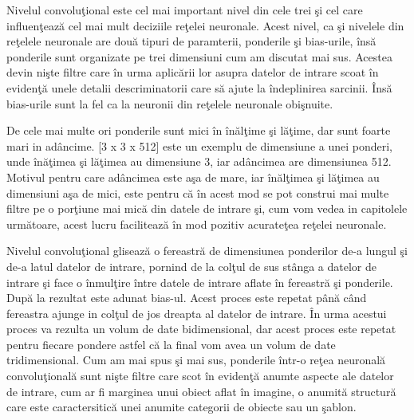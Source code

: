 Nivelul convolu\c{t}ional este cel mai important nivel din cele trei \c{s}i cel care influen\c{t}eaz\u{a} cel mai mult deciziile re\c{t}elei neuronale. Acest nivel, ca \c{s}i nivelele din re\c{t}elele neuronale are dou\u{a} tipuri de paramterii, ponderile \c{s}i bias-urile, \^{i}ns\u{a} ponderile sunt organizate pe trei dimensiuni cum am discutat mai sus. Acestea devin ni\c{s}te filtre care \^{i}n urma aplic\u{a}rii lor asupra datelor de intrare scoat \^{i}n eviden\c{t}\u{a} unele detalii descriminatorii care s\u{a} ajute la \^{i}ndeplinirea sarcinii. \^{I}ns\u{a} bias-urile sunt la fel ca la neuronii din re\c{t}elele neuronale obi\c{s}nuite. 

\par

De cele mai multe ori ponderile sunt mici \^{i}n \^{i}n\u{a}l\c{t}ime \c{s}i l\u{a}\c{t}ime, dar sunt foarte mari in ad\^{a}ncime. [3 x 3 x 512] este un exemplu de dimensiune a unei ponderi, unde \^{i}n\u{a}\c{t}imea \c{s}i l\u{a}\c{t}imea au dimensiune 3, iar ad\^{a}ncimea are dimensiunea 512. Motivul pentru care ad\^{a}ncimea este a\c{s}a de mare, iar \^{i}n\u{a}l\c{t}imea \c{s}i l\u{a}\c{t}imea au dimensiuni a\c{s}a de mici,  este pentru c\u{a} \^{i}n acest mod se pot construi mai multe filtre pe o por\c{t}iune mai mic\u{a} din datele de intrare \c{s}i, cum vom vedea in capitolele urm\u{a}toare, acest lucru faciliteaz\u{a} \^{i}n mod pozitiv acurate\c{t}ea re\c{t}elei neuronale.

\par

Nivelul convolu\c{t}ional gliseaz\u{a} o fereastr\u{a} de dimensiunea ponderilor de-a lungul \c{s}i de-a latul datelor de intrare, pornind de la col\c{t}ul de sus st\^{a}nga a datelor de intrare \c{s}i face o \^{i}nmul\c{t}ire \^{i}ntre  datele de intrare aflate \^{i}n fereastr\u{a} \c{s}i ponderile. Dup\u{a} la rezultat este adunat bias-ul. Acest proces este repetat p\^{a}n\u{a} c\^{a}nd fereastra ajunge in col\c{t}ul de jos dreapta al datelor de intrare. \^{I}n urma acestui proces va rezulta un volum de date bidimensional, dar acest proces este repetat pentru fiecare pondere astfel c\u{a} la final vom avea un volum de date tridimensional. Cum am mai spus \c{s}i mai sus, ponderile \^{i}ntr-o re\c{t}ea neuronal\u{a} convolu\c{t}ional\u{a} sunt ni\c{s}te filtre care scot \^{i}n eviden\c{t}\u{a} anumte aspecte ale datelor de intrare, cum ar fi marginea unui obiect aflat \^{i}n imagine, o anumit\u{a} structur\u{a} care este caractersitic\u{a} unei anumite categorii de obiecte sau un \c{s}ablon.

